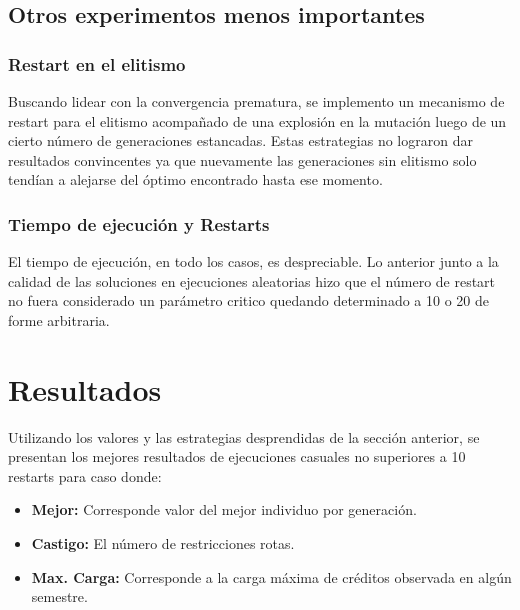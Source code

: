 \documentclass[letter, 10pt]{article}
\begin{document}
\subsection{Otros experimentos menos importantes}
\subsubsection{Restart en el elitismo}
Buscando lidear con la convergencia prematura, se implemento un mecanismo de
restart para el elitismo acompañado de una explosión en la  mutación luego de un cierto
número de generaciones estancadas. Estas estrategias no lograron dar resultados
convincentes ya que nuevamente las generaciones sin elitismo solo tendían a
alejarse del óptimo encontrado hasta ese momento.
\subsubsection{Tiempo de ejecución y Restarts}
El tiempo de ejecución, en todo los casos, es despreciable. Lo
anterior junto a la calidad de las soluciones en ejecuciones
aleatorias hizo que el número de restart no fuera considerado un
parámetro critico quedando determinado a 10 o 20 de forme arbitraria.



\section{Resultados}
Utilizando los valores y las estrategias desprendidas de la sección anterior, se
presentan los mejores resultados de ejecuciones casuales no superiores a 10
restarts para caso donde:

\begin{itemize}
  \item \textbf{Mejor:} Corresponde valor del mejor individuo por generación.
  \item \textbf{Castigo:} El número de restricciones rotas.
  \item \textbf{Max. Carga:} Corresponde a la carga máxima de créditos observada en algún semestre.
\end{itemize}


\begin{center}

\end{center}
\begin{center}

\end{center}
\begin{center}

\end{center}
\end{document}
